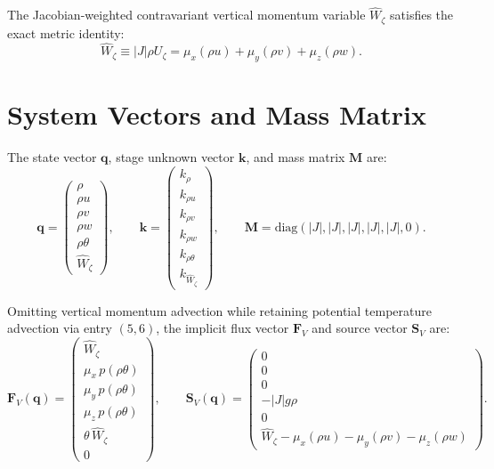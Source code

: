 \documentclass[11pt,a4paper]{article}
\begin{document}
		The Jacobian-weighted contravariant vertical momentum variable $\widehat{W}_\zeta$ satisfies the exact metric identity:
		\begin{equation}
			\widehat{W}_\zeta \equiv |J| \rho U_\zeta = \mu_x (\rho u) + \mu_y (\rho v) + \mu_z (\rho w).
		\end{equation}
		
		\section{System Vectors and Mass Matrix}
		
		The state vector $\boldsymbol{q}$, stage unknown vector $\boldsymbol{k}$, and mass matrix $\mathbf{M}$ are:
		\begin{equation}
			\boldsymbol{q} = \begin{pmatrix} \rho \\[2pt] \rho u \\[2pt] \rho v \\[2pt] \rho w \\[2pt] \rho \theta \\[2pt] \widehat{W}_\zeta \end{pmatrix}, \qquad
			\boldsymbol{k} = \begin{pmatrix} k_\rho \\[2pt] k_{\rho u} \\[2pt] k_{\rho v} \\[2pt] k_{\rho w} \\[2pt] k_{\rho \theta} \\[2pt] k_{\widehat{W}_\zeta} \end{pmatrix}, \qquad
			\mathbf{M} = \text{diag}\left( |J|, |J|, |J|, |J|, |J|, 0 \right).
		\end{equation}
		
		Omitting vertical momentum advection while retaining potential temperature advection via entry $(5,6)$, the implicit flux vector $\mathbf{F}_V$ and source vector $\mathbf{S}_V$ are:
		\begin{equation}
			\mathbf{F}_V(\boldsymbol{q}) = \begin{pmatrix} 
				\widehat{W}_\zeta \\[6pt]
				\mu_x \, p(\rho \theta) \\[6pt]
				\mu_y \, p(\rho \theta) \\[6pt]
				\mu_z \, p(\rho \theta) \\[6pt]
				\theta \, \widehat{W}_\zeta \\[6pt]
				0
			\end{pmatrix}, \qquad
			\mathbf{S}_V(\boldsymbol{q}) = \begin{pmatrix}
				0 \\[6pt]
				0 \\[6pt]
				0 \\[6pt]
				-|J| g \rho \\[6pt]
				0 \\[6pt]
				\widehat{W}_\zeta - \mu_x (\rho u) - \mu_y (\rho v) - \mu_z (\rho w)
			\end{pmatrix}.
		\end{equation}
		
\end{document}
